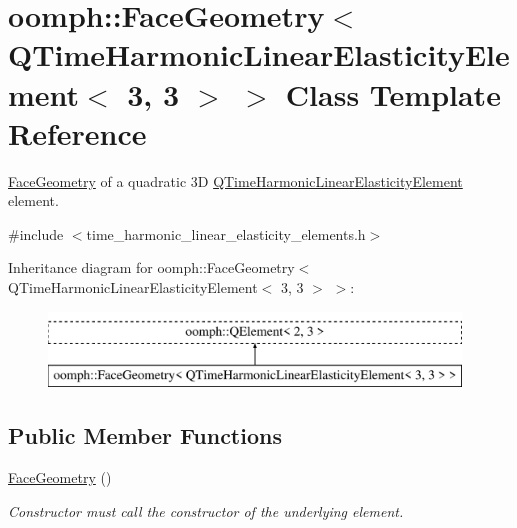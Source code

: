\hypertarget{classoomph_1_1FaceGeometry_3_01QTimeHarmonicLinearElasticityElement_3_013_00_013_01_4_01_4}{}\section{oomph\+:\+:Face\+Geometry$<$ Q\+Time\+Harmonic\+Linear\+Elasticity\+Element$<$ 3, 3 $>$ $>$ Class Template Reference}
\label{classoomph_1_1FaceGeometry_3_01QTimeHarmonicLinearElasticityElement_3_013_00_013_01_4_01_4}


\hyperlink{classoomph_1_1FaceGeometry}{Face\+Geometry} of a quadratic 3D \hyperlink{classoomph_1_1QTimeHarmonicLinearElasticityElement}{Q\+Time\+Harmonic\+Linear\+Elasticity\+Element} element.  




{\ttfamily \#include $<$time\+\_\+harmonic\+\_\+linear\+\_\+elasticity\+\_\+elements.\+h$>$}

Inheritance diagram for oomph\+:\+:Face\+Geometry$<$ Q\+Time\+Harmonic\+Linear\+Elasticity\+Element$<$ 3, 3 $>$ $>$\+:\begin{figure}[H]
\begin{center}
\leavevmode
\includegraphics[height=2.000000cm]{classoomph_1_1FaceGeometry_3_01QTimeHarmonicLinearElasticityElement_3_013_00_013_01_4_01_4}
\end{center}
\end{figure}
\subsection*{Public Member Functions}
\begin{DoxyCompactItemize}
\item 
\hyperlink{classoomph_1_1FaceGeometry_3_01QTimeHarmonicLinearElasticityElement_3_013_00_013_01_4_01_4_a97003e3021aac73a54e01dd44303bdfb}{Face\+Geometry} ()
\begin{DoxyCompactList}\small\item\em Constructor must call the constructor of the underlying element. \end{DoxyCompactList}\end{DoxyCompactItemize}



